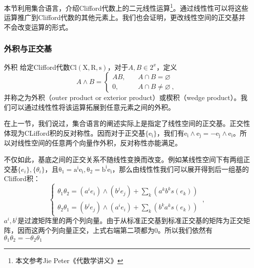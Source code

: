 

\begin{issues}
\issueTODO
\end{issues}

本节利用集合语言，介绍Clifford代数上的二元线性运算\footnote{本文参考Jie Peter《代数学讲义》}。通过线性性可以将这些运算推广到Clifford代数的其他元素上。我们也会证明，更改线性空间的正交基并不会改变运算的形式。
\subsubsection{外积与正交基}
\begin{definition}{外积}
给定Clifford代数$\mathrm {Cl(X,R,s)}$，对于$A,B\in 2^x$，定义
\begin{equation}
A \wedge B=\left\{\begin{aligned}
A B,\quad& A \cap B=\varnothing \\
0,\quad& A \cap B \neq \varnothing~,
\end{aligned}\right.
\end{equation}
并称之为外积（outer product or exterior product）或楔积（wedge product）。我们可以通过线性性将该运算拓展到任意元素之间的外积。
\end{definition}

在上一节，我们说过，集合语言的阐述实际上是指定了线性空间的正交基。正交性体现为CLifford积的反对称性。因而对于正交基$\{\mathrm {e_i}\}$，我们有$\mathrm{e_i\wedge e_j=-e_j\wedge e_i}$。所以对线性空间的任意两个向量作外积，反对称性亦能满足。

不仅如此，基底之间的正交关系不随线性变换而改变。例如某线性空间下有两组正交基$\{e_i\},\{\theta_i\}$，且$\mathrm {\theta_1=a^ie_i,\theta_2=b^ie_i}$，那么由线性性我们可以展开得到后一组基的Clifford积：
\begin{equation}
\left\{\begin{array}{l}
\theta_1 \theta_2=\left(a^i e_i\right) \wedge\left(b^j e_j\right)+\sum_k\left(a^k b^k s(e_k)\right) \\
\theta_2 \theta_1=\left(b^j e_j\right) \wedge\left(a^i e_i\right)+\sum_k\left(b^k a^k s(e_k)\right)
\end{array}\right.~,
\end{equation}
$a^i,b^i$是过渡矩阵里的两个列向量。由于从标准正交基到标准正交基的矩阵为正交矩阵，因而这两个列向量正交，上式右端第二项都为0。所以我们依然有$\theta_1\theta_2=-\theta_2\theta_1$

